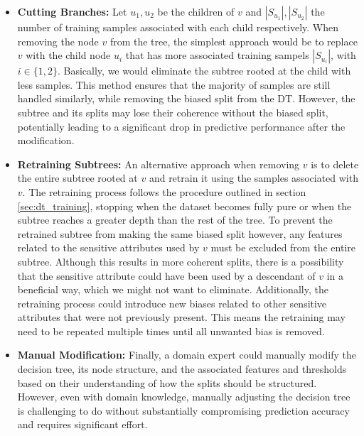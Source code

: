 \begin{itemize}
    \item \textbf{Cutting Branches:} 
    Let $u_1, u_2$ be the children of $v$ and $|S_{u_1}|, |S_{u_2}|$
    the number of training samples associated with each child respectively.
    When removing the node $v$ from the tree,
    the simplest approach would be to replace $v$ with the child node $u_i$
    that has more associated training sampels $|S_{u_i}|$, with $i \in \{1,2\}$.
    Basically, we would eliminate the subtree rooted at the child with less samples.
    This method ensures that the majority of samples are still handled similarly,
    while removing the biased split from the DT.
    However, the subtree and its splits may lose their coherence without the biased split,
    potentially leading to a significant drop in predictive performance after the modification.

    \item \textbf{Retraining Subtrees:}
    An alternative approach when removing $v$ is to delete the entire subtree rooted at $v$
    and retrain it using the samples associated with $v$.  
    The retraining process follows the procedure outlined in section \ref{sec:dt_training},
    stopping when the dataset becomes fully pure or when the subtree reaches a greater depth than the rest of the tree.  
    To prevent the retrained subtree from making the same biased split however,
    any features related to the sensitive attributes used by $v$ must be excluded from the entire subtree.  
    Although this results in more coherent splits,
    there is a possibility that the sensitive attribute could have been used by a descendant of $v$ in a beneficial way,
    which we might not want to eliminate.
    Additionally, the retraining process could introduce new biases related to other sensitive attributes that were not previously present.  
    This means the retraining may need to be repeated multiple times until all unwanted bias is removed.  

    \item \textbf{Manual Modification:}  
    Finally, a domain expert could manually modify the decision tree, its node structure,
    and the associated features and thresholds based on their understanding of how the splits should be structured.
    However, even with domain knowledge,
    manually adjusting the decision tree is challenging to do without substantially compromising prediction accuracy
    and requires significant effort.
\end{itemize}

